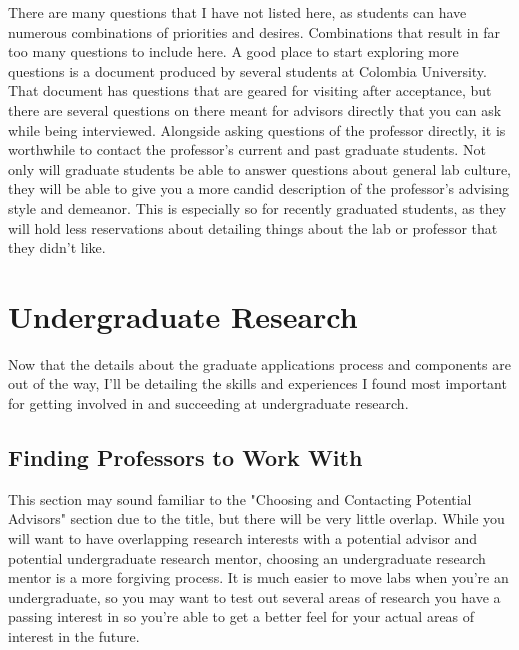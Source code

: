 \documentclass[12pt]{article}
\begin{document}
There are many questions that I have not listed here, as students can have numerous combinations of priorities and desires. Combinations that result in far too many questions to include here. A good place to start exploring more questions is a document produced by several students at Colombia University. \cite{colombiaquestions} That document has questions that are geared for visiting after acceptance, but there are several questions on there meant for advisors directly that you can ask while being interviewed. Alongside asking questions of the professor directly, it is worthwhile to contact the professor's current and past graduate students. Not only will graduate students be able to answer questions about general lab culture, they will be able to give you a more candid description of the professor's advising style and demeanor. This is especially so for recently graduated students, as they will hold less reservations about detailing things about the lab or professor that they didn't like.

\section{Undergraduate Research}

Now that the details about the graduate applications process and components are out of the way, I'll be detailing the skills and experiences I found most important for getting involved in and succeeding at undergraduate research.

\subsection{Finding Professors to Work With} \label{choosingprof}

This section may sound familiar to the "Choosing and Contacting Potential Advisors" section due to the title, but there will be very little overlap. While you will want to have overlapping research interests with a potential advisor and potential undergraduate research mentor, choosing an undergraduate research mentor is a more forgiving process. It is much easier to move labs when you're an undergraduate, so you may want to test out several areas of research you have a passing interest in so you're able to get a better feel for your actual areas of interest in the future. 
\end{document}
